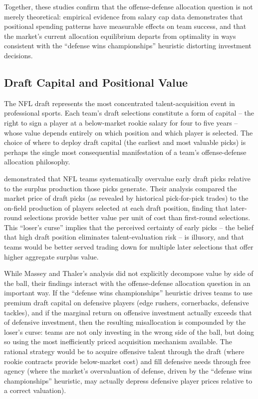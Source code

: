 Together, these studies confirm that the offense-defense allocation question is not merely theoretical: empirical evidence from salary cap data demonstrates that positional spending patterns have measurable effects on team success, and that the market's current allocation equilibrium departs from optimality in ways consistent with the ``defense wins championships'' heuristic distorting investment decisions.

\subsection{Draft Capital and Positional Value}
\label{sec:draft-capital}

The NFL draft represents the most concentrated talent-acquisition event in professional sports. Each team's draft selections constitute a form of capital  -- the right to sign a player at a below-market rookie salary for four to five years  -- whose value depends entirely on which position and which player is selected. The choice of where to deploy draft capital (the earliest and most valuable picks) is perhaps the single most consequential manifestation of a team's offense-defense allocation philosophy.

\textcite{massey2013loserscurse} demonstrated that NFL teams systematically overvalue early draft picks relative to the surplus production those picks generate. Their analysis compared the market price of draft picks (as revealed by historical pick-for-pick trades) to the on-field production of players selected at each draft position, finding that later-round selections provide better value per unit of cost than first-round selections. This ``loser's curse'' implies that the perceived certainty of early picks  -- the belief that high draft position eliminates talent-evaluation risk  -- is illusory, and that teams would be better served trading down for multiple later selections that offer higher aggregate surplus value.

While Massey and Thaler's analysis did not explicitly decompose value by side of the ball, their findings interact with the offense-defense allocation question in an important way. If the ``defense wins championships'' heuristic drives teams to use premium draft capital on defensive players (edge rushers, cornerbacks, defensive tackles), and if the marginal return on offensive investment actually exceeds that of defensive investment, then the resulting misallocation is compounded by the loser's curse: teams are not only investing in the wrong side of the ball, but doing so using the most inefficiently priced acquisition mechanism available. The rational strategy would be to acquire offensive talent through the draft (where rookie contracts provide below-market cost) and fill defensive needs through free agency (where the market's overvaluation of defense, driven by the ``defense wins championships'' heuristic, may actually depress defensive player prices relative to a correct valuation).

